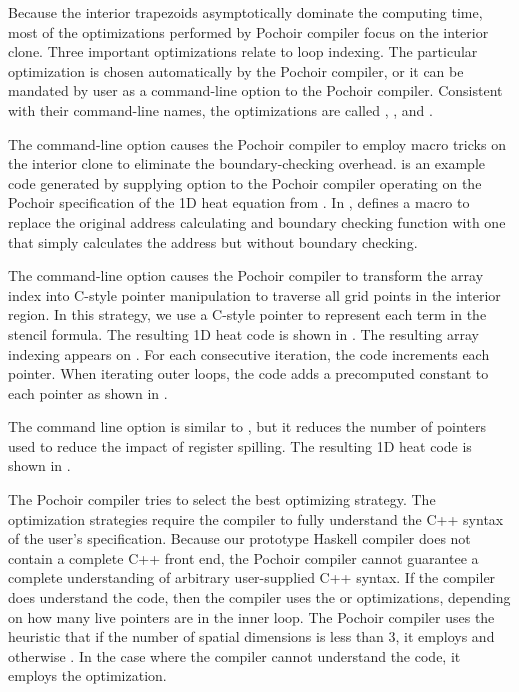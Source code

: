 
Because the interior trapezoids asymptotically dominate the computing
time, most of the optimizations performed by Pochoir compiler focus on
the interior clone.  Three important optimizations relate to loop
indexing.  The particular optimization is chosen automatically by the
Pochoir compiler, or it can be mandated by user as a command-line
option to the Pochoir compiler.  Consistent with their command-line
names, the optimizations are called ,
, and .

The  command-line option causes the Pochoir
compiler to employ macro tricks on the interior clone to eliminate the
boundary-checking overhead.   is an example code
generated by supplying option  to the
Pochoir compiler operating on the Pochoir specification of the 1D heat
equation from .  In ,
 defines a macro to replace the original address
calculating and boundary checking function with one that simply
calculates the address but without boundary checking.

The  command-line option causes the Pochoir
compiler to transform the array index into C-style pointer
manipulation to traverse all grid points in the interior region.  In
this strategy, we use a C-style pointer to represent each term in the
stencil formula.  The resulting 1D heat code is shown in
.  The resulting array indexing appears on
.  For each consecutive iteration, the code
increments each pointer.  When iterating outer loops, the code adds a
precomputed constant to each pointer as shown in
.
	
The  command line option is similar to
, but it reduces the number of pointers used to
reduce the impact of register spilling.  The resulting 1D heat code is
shown in .

The Pochoir compiler tries to select the best optimizing strategy. 
The  optimization strategies require the compiler to
fully understand the {C++} syntax of the user's specification.
Because our prototype {Haskell} compiler does not contain a complete
{C++} front end, the Pochoir compiler cannot guarantee a complete
understanding of arbitrary user-supplied {C++} syntax.  If the
compiler does understand the code, then the compiler uses the
 or  optimizations,
depending on how many live pointers are in the inner loop.  The
Pochoir compiler uses the heuristic that if the number of spatial
dimensions is less than $3$, it employs  and
otherwise .  In the case where the compiler cannot
understand the code, it employs the 
optimization.

